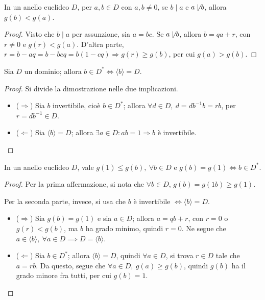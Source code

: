 \documentclass[11pt, a4paper]{scrartcl}
\theoremstyle{definition}
\numberwithin{esempio}{section}
\theoremstyle{definition}
\numberwithin{obs}{section}
\numberwithin{nota}{section}
\numberwithin{equation}{subsection}
\begin{document}
\begin{lemma}
	{}{}
	In un anello euclideo $D$, per $a,b \in D$ con $a,b \neq 0$, se $b  \mid a$ e $a \not  \mid b$, allora $g(b) < g(a)$.
	\begin{proof}
		Visto che $b  \mid a$ per assunzione, sia $a = bc$.
		Se $a \not  \mid b$, allora $b = qa + r$, con $r\neq 0$ e $g(r) < g(a)$.
		D'altra parte, $r = b - aq = b - bcq = b(1-cq)\Rightarrow g(r) \ge g(b)$, per cui $g(a) > g(b)$.
	\end{proof}
\end{lemma}
\begin{prop}
	{}{}
Sia $D$ un dominio; allora $b \in D^* \iff \langle b \rangle= D$.
\begin{proof}
	Si divide la dimostrazione nelle due implicazioni.
	\begin{itemize}
		\item ($\Rightarrow $) Sia $b$ invertibile, cio\`e $b \in D^*$; allora $\forall d \in D, \ d = d b^{-1} b = r b$, per $r = db^{-1} \in D$.
		\item ($\Leftarrow$) Sia $\langle b \rangle= D$; allora $\exists a \in D : a b = 1 \Rightarrow b$ \`e invertibile.
	\end{itemize}
\end{proof}
\end{prop}
\begin{lemma}
	{}{}
	In un anello euclideo $D$, vale $g(1) \le g(b), \ \forall b \in D$ e $g(b) = g(1) \iff b \in D^*$.
	\begin{proof}
		Per la prima affermazione, si nota che $\forall b \in D$, $g(b)=g(1b) \ge g(1)$.

		Per la seconda parte, invece, si usa che $b$ \`e invertibile $\iff \langle b \rangle=D$.
		\begin{itemize}
			\item ($\Rightarrow $) Sia $g(b) = g(1)$ e sia $a \in D$; allora $a = qb +r$, con $r = 0$ o $g(r) < g(b)$, ma $b$ ha grado minimo, quindi $r =0 $. 
				Ne segue che $a \in \langle b \rangle, \ \forall a \in D\implies D = \langle b \rangle$.
			\item ($\Leftarrow$) Sia $b \in D^*$; allora $\langle b \rangle= D$, quindi $\forall  a \in D$, si trova $r \in D$ tale che $a = rb$.
				Da questo, segue che $\forall a \in D, \ g(a) \ge g(b)$, quindi $g(b)$ ha il grado minore fra tutti, per cui $g(b) = 1$.
		\end{itemize}
	\end{proof}
\end{lemma}
\end{document}
